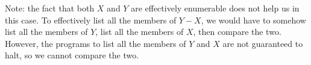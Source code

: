 \begin{problem}
\begin{enumalph}
\begin{Answer}
        \step
        Note: the fact that both $X$ and $Y$ are effectively enumerable
        does not help us in this case.
        To effectively list all the members of $Y - X$,
        we would have to somehow list all the members of $Y$,
        list all the members of $X$, then compare the two.
        However, the programs to list all the members of $Y$ and $X$
        are not guaranteed to halt, so we cannot compare the two.

      \end{Answer}
  \end{enumalph}
\end{problem}

